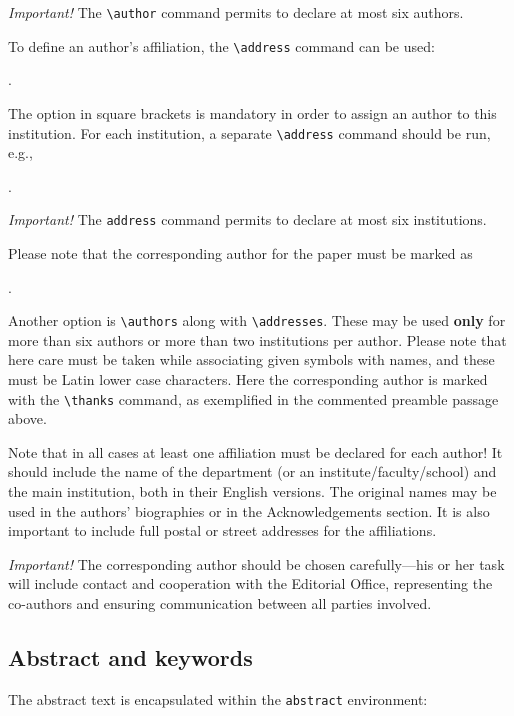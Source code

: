 \documentclass{amcs}
\begin{document}
\medskip\noindent
\emph{Important!} The \verb+\author+ command permits to declare at most six authors.

To define an author's affiliation, the \verb+\address+ command can be used:

\medskip
{}.

\medskip\noindent
The option in square brackets is mandatory in order to assign an author to this institution. For each institution, a separate \verb+\address+ command should be run, e.g.,

\medskip
{}
.

\medskip\noindent
\emph{Important!} The \verb+address+ command permits to declare at most six institutions.

Please note that the corresponding author for the paper must be marked as

\medskip
{}.

\medskip\noindent
Another option is \verb+\authors+ along with  \verb+\addresses+. These may be used \textbf{only} for more than six authors or more than two institutions per author. Please note that here care must be taken while associating given symbols with names, and these must be Latin lower case characters. Here the corresponding author is marked with the \verb+\thanks+ command, as exemplified in the commented preamble passage above.

Note that in all cases at least one affiliation must be declared for each author! It should include the name of the department (or an institute/faculty/school) and the main institution, both in their English versions. The original names may be used in the authors' biographies or in the Acknowledgements section. It is also important to include full postal or street addresses for the affiliations.

\medskip\noindent
\emph{Important!} The corresponding author should be chosen carefully---his or her task will include contact and cooperation with the Editorial Office, representing the co-authors and ensuring communication between all parties involved.

\subsection{Abstract and keywords}
The abstract text is encapsulated within the \verb+abstract+ environment:
\end{document}
